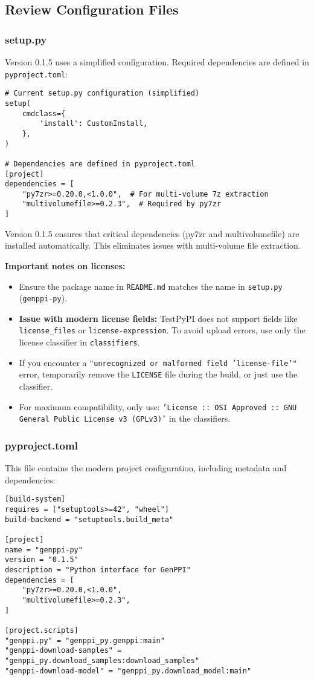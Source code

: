 \documentclass[11pt, a4paper]{article}
\begin{document}
\subsection{Review Configuration Files}
\subsubsection{setup.py}
Version 0.1.5 uses a simplified configuration. Required dependencies are defined in \texttt{pyproject.toml}:
\begin{lstlisting}[style=pythonstyle]
# Current setup.py configuration (simplified)
setup(
    cmdclass={
        'install': CustomInstall,
    },
)

# Dependencies are defined in pyproject.toml
[project]
dependencies = [
    "py7zr>=0.20.0,<1.0.0",  # For multi-volume 7z extraction
    "multivolumefile>=0.2.3",  # Required by py7zr
]
\end{lstlisting}
Version 0.1.5 ensures that critical dependencies (py7zr and multivolumefile) are installed automatically. This eliminates issues with multi-volume file extraction.

\textbf{Important notes on licenses:} 
\begin{itemize}
    \item Ensure the package name in \texttt{README.md} matches the name in \texttt{setup.py} (\texttt{genppi-py}).
    \item \textbf{Issue with modern license fields:} TestPyPI does not support fields like \texttt{license\_files} or \texttt{license-expression}. To avoid upload errors, use only the license classifier in \texttt{classifiers}.
    \item If you encounter a \texttt{"unrecognized or malformed field 'license-file'"} error, temporarily remove the \texttt{LICENSE} file during the build, or just use the classifier.
    \item For maximum compatibility, only use: \texttt{'License :: OSI Approved :: GNU General Public License v3 (GPLv3)'} in the classifiers.
\end{itemize}

\subsubsection{pyproject.toml}
This file contains the modern project configuration, including metadata and dependencies:
\begin{lstlisting}[style=bashstyle]
[build-system]
requires = ["setuptools>=42", "wheel"]
build-backend = "setuptools.build_meta"

[project]
name = "genppi-py"
version = "0.1.5"
description = "Python interface for GenPPI"
dependencies = [
    "py7zr>=0.20.0,<1.0.0",
    "multivolumefile>=0.2.3",
]

[project.scripts]
"genppi.py" = "genppi_py.genppi:main"
"genppi-download-samples" = "genppi_py.download_samples:download_samples"
"genppi-download-model" = "genppi_py.download_model:main"
\end{lstlisting}
\end{document}
